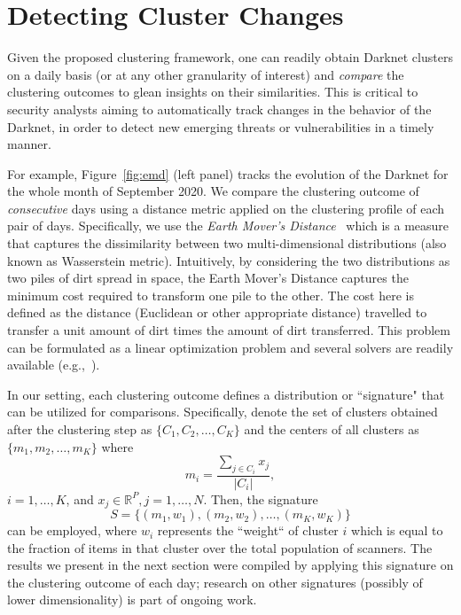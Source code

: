 \documentclass[manuscript, nonacm]{acmart}
\begin{document}
\section{Detecting Cluster Changes}
\label{sec:emd}

Given the proposed clustering framework, one can readily obtain Darknet clusters
on a daily basis (or at any other granularity of interest) and \emph{compare} the
clustering outcomes to glean insights on their similarities. This is critical
to security analysts aiming to automatically track changes in the behavior of the Darknet,
in order to detect new emerging threats or vulnerabilities in a timely manner.

For example, Figure~\ref{fig:emd} (left panel) tracks the evolution of the Darknet for the
whole month of September 2020. We compare the clustering outcome of \emph{consecutive} days 
using a distance metric applied on the clustering profile of each pair of days. 
Specifically, we
use the \emph{Earth Mover's Distance}~\cite{710701} which is a measure 
that captures the dissimilarity between 
two multi-dimensional distributions (also known as Wasserstein metric).  
Intuitively, by considering
the two distributions as two piles of dirt spread in space,
the Earth Mover's Distance captures the minimum cost required
to transform one pile to the other. The cost here is defined
as the distance (Euclidean or other appropriate distance) travelled to transfer a unit amount of dirt
times the amount of dirt transferred. This problem can be formulated as a linear 
optimization problem and several solvers are readily available (e.g.,~\cite{pywasserstein}).

In our setting, each clustering outcome defines a distribution or ``signature"
that can be utilized for comparisons. Specifically, denote the set of clusters
obtained after the clustering step as $\{C_1, C_2, \ldots, C_K\}$ and the centers
of all clusters as $\{m_1, m_2, \ldots, m_K\}$ where 
$$
m_i = \frac{\sum_{j \in C_i} x_{j}}{|C_i|},  
$$
$i = 1,\ldots, K$, and $x_j \in \mathbb{R}^P, j = 1,\ldots, N$.
Then, the signature
$$
S = \{(m_1, w_1), (m_2, w_2), \ldots, (m_K, w_K)\}
$$
can be employed, where $w_i$ represents the ``weight`` of cluster $i$
which is equal to the fraction of items in that cluster over the total
population of scanners. The results we present in the next section
were compiled by applying this signature on the clustering outcome of each day;
research on other signatures (possibly of lower dimensionality) is part of ongoing work. 
\end{document}
